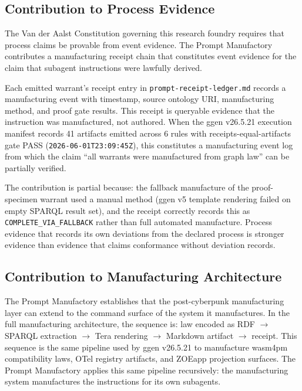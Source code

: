 \subsection{Contribution to Process Evidence}
\label{sec:research-prompt-manufactory-contribution-evidence}

The Van der Aalst Constitution governing this research foundry requires that process
claims be provable from event evidence. The Prompt Manufactory contributes a
manufacturing receipt chain that constitutes event evidence for the claim that subagent
instructions were lawfully derived.

Each emitted warrant's receipt entry in \texttt{prompt-receipt-ledger.md} records a
manufacturing event with timestamp, source ontology URI, manufacturing method, and
proof gate results. This receipt is queryable evidence that the instruction was
manufactured, not authored. When the ggen v26.5.21 execution manifest records 41
artifacts emitted across 6 rules with receipts-equal-artifacts gate PASS
(\texttt{2026-06-01T23:09:45Z}), this constitutes a manufacturing event log from which
the claim ``all warrants were manufactured from graph law'' can be partially verified.

The contribution is partial because: the fallback manufacture of the proof-specimen
warrant used a manual method (ggen v5 template rendering failed on empty SPARQL result
set), and the receipt correctly records this as \texttt{COMPLETE\_VIA\_FALLBACK} rather
than full automated manufacture. Process evidence that records its own deviations
from the declared process is stronger evidence than evidence that claims conformance
without deviation records.

\subsection{Contribution to Manufacturing Architecture}
\label{sec:research-prompt-manufactory-contribution-architecture}

The Prompt Manufactory establishes that the post-cyberpunk manufacturing layer can
extend to the command surface of the system it manufactures. In the full manufacturing
architecture, the sequence is: law encoded as RDF $\to$ SPARQL extraction $\to$ Tera
rendering $\to$ Markdown artifact $\to$ receipt. This sequence is the same pipeline
used by ggen v26.5.21 to manufacture wasm4pm compatibility laws, OTel registry
artifacts, and ZOEapp projection surfaces. The Prompt Manufactory applies this same
pipeline recursively: the manufacturing system manufactures the instructions for its
own subagents.


